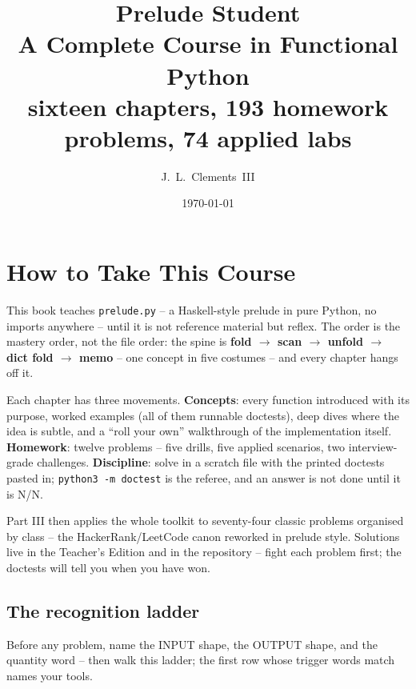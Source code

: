 \documentclass[10pt,letterpaper]{book}
\title{\Huge\bfseries Prelude Student\\[6pt]\Large A Complete Course in Functional Python\\[14pt]\normalsize sixteen chapters, 193 homework problems, 74 applied labs}
\author{J.~L.~Clements~III}
\date{\today}
\begin{document}
\frontmatter
\maketitle

\chapter{How to Take This Course}
This book teaches \texttt{prelude.py} -- a Haskell-style prelude in pure
Python, no imports anywhere -- until it is not reference material but
reflex. The order is the mastery order, not the file order: the spine is
\textbf{fold $\rightarrow$ scan $\rightarrow$ unfold $\rightarrow$ dict fold
$\rightarrow$ memo} -- one concept in five costumes -- and every chapter
hangs off it.

Each chapter has three movements. \textbf{Concepts}: every function
introduced with its purpose, worked examples (all of them runnable
doctests), deep dives where the idea is subtle, and a ``roll your own''
walkthrough of the implementation itself. \textbf{Homework}: twelve
problems -- five drills, five applied scenarios, two interview-grade
challenges. \textbf{Discipline}: solve in a scratch file with the printed
doctests pasted in; \texttt{python3 -m doctest} is the referee, and an
answer is not done until it is N/N.

Part III then applies the whole toolkit to seventy-four classic problems
organised by class -- the HackerRank/LeetCode canon reworked in prelude
style. Solutions live in the Teacher's Edition and in the repository -- fight each problem first; the doctests will tell you when you have won.

\section*{The recognition ladder}
Before any problem, name the INPUT shape, the OUTPUT shape, and the quantity
word -- then walk this ladder; the first row whose trigger words match names
your tools.
\end{document}
